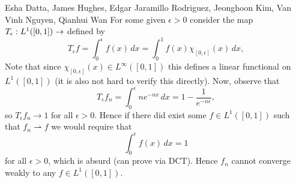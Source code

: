 

\begin{solution}{Esha Datta, James Hughes, Edgar Jaramillo Rodriguez, Jeonghoon Kim, Van Vinh Nguyen, Qianhui Wan}
        For some given $\epsilon >0$ consider the map $T_\epsilon : L^1([0,1])\to \real$ defined by
        \[ T_\epsilon f = \int_0^\epsilon f(x)\,dx  = \int_0^1f(x) \chi_{[0,\epsilon]}(x)\, dx, \]
        Note that since $\chi_{[0,\epsilon]}(x) \in L^\infty([0,1])$ this defines a linear functional on $L^1([0,1])$ (it is also not hard to verify this directly).
        Now, observe that 
        \[ T_\epsilon f_n = \int_0^\epsilon ne^{-nx}\,dx = 1-\frac{1}{e^{-n\epsilon}}, \]
        so $T_\epsilon f_n \to 1$ for all $\epsilon >0$.
        Hence if there did exist some $f \in L^1([0,1])$ such that $f_n \rightharpoonup f$ we would require that 
        \[ \int_0^\epsilon f(x)\,dx = 1 \]
        for all $\epsilon >0$, which is absurd (can prove via DCT).
        Hence $f_n$ cannot converge weakly to any $f \in L^1([0,1])$.
\end{solution}


